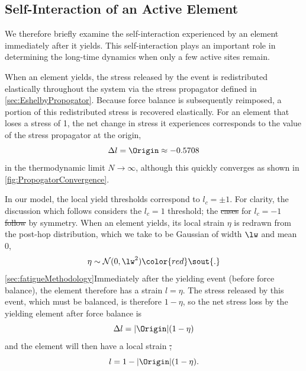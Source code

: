 \documentclass[asymmetricmargins]{library/duthesis}%
\providecommand{\DIFadd}[1]{{\protect\color{blue}\uwave{#1}}} %
\providecommand{\DIFdel}[1]{{\protect\color{red}\sout{#1}}}                      %
\providecommand{\DIFaddbegin}{} %
\providecommand{\DIFaddend}{} %
\providecommand{\DIFdelbegin}{} %
\providecommand{\DIFdelend}{} %
\begin{document}
\subsection*{Self-Interaction of an Active Element}

We therefore briefly examine the self-interaction experienced by an element immediately after it yields. This self-interaction plays an important role in determining the long-time dynamics when only a few active sites remain.

When an element yields, the stress released by the event is redistributed elastically throughout the system via the stress propagator defined in \cref{sec:EshelbyPropogator}. Because force balance is subsequently reimposed, a portion of this redistributed stress is recovered elastically. For an element that loses a stress of 1, the net change in stress it experiences corresponds to the value of the stress propagator at the origin, 
\[
\Delta l = \Origin \approx -0.5708 
\]
in the thermodynamic limit $N\to\infty$, although this quickly converges as shown in \cref{fig:PropogatorConvergence}.

In our model, the local yield thresholds correspond to $l_c=\pm 1$. For clarity, the discussion which follows considers the \DIFdelbegin \DIFdel{$l_c= 1$ }\DIFdelend \DIFaddbegin \DIFadd{$l_c=1$ }\DIFaddend threshold; the \DIFdelbegin \DIFdel{cases }\DIFdelend \DIFaddbegin \DIFadd{case }\DIFaddend for $l_c=-1$ \DIFdelbegin \DIFdel{follow }\DIFdelend \DIFaddbegin \DIFadd{follows }\DIFaddend by symmetry. When an element yields, its local strain $\eta$ is redrawn from the post-hop distribution, which we take to be Gaussian of width $\lw$ and mean $0$,
\[
 \eta \sim \mathcal{N}(0,\lw^2)
\DIFdelbegin \DIFdel{.
}\DIFdelend \]
\DIFaddbegin \DIFadd{as disscussed in }\cref{sec:fatigueMethodology}\DIFadd{. }\DIFaddend Immediately after the yielding event (before force balance), the element therefore has a strain $l=\eta$. The stress released by this event, which must be balanced, is therefore $1-\eta$, so the net stress loss by the yielding element after force balance is
\[
\Delta l = |\Origin|(1-\eta)
\]
and the element will then have a local strain
\DIFdelbegin \DIFdel{,
}\DIFdelend \[
l = 1 - |\Origin|(1-\eta).
\]
\end{document}
